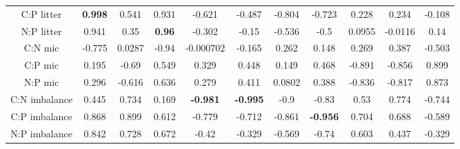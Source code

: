 \documentclass[authoryear,preprint,review,12pt]{elsarticle}
\begin{document}
\begin{table}[h!]
\begin{center}
{\begin{tabular}{ccccccccccc}
  C:P litter & \textbf{ 0.998 } & 0.541 & 0.931 & -0.621 & -0.487 & -0.804 & -0.723 & 0.228 & 0.234 & -0.108 \\ 
  N:P litter & 0.941 & 0.35 & \textbf{ 0.96 } & -0.302 & -0.15 & -0.536 & -0.5 & 0.0955 & -0.0116 & 0.14 \\ 
  C:N mic & -0.775 & 0.0287 & -0.94 & -0.000702 & -0.165 & 0.262 & 0.148 & 0.269 & 0.387 & -0.503 \\ 
  C:P mic & 0.195 & -0.69 & 0.549 & 0.329 & 0.448 & 0.149 & 0.468 & -0.891 & -0.856 & 0.899 \\ 
  N:P mic & 0.296 & -0.616 & 0.636 & 0.279 & 0.411 & 0.0802 & 0.388 & -0.836 & -0.817 & 0.873 \\ 
  C:N imbalance & 0.445 & 0.734 & 0.169 & \textbf{ -0.981 } & \textbf{ -0.995 } & -0.9 & -0.83 & 0.53 & 0.774 & -0.744 \\ 
  C:P imbalance & 0.868 & 0.899 & 0.612 & -0.779 & -0.712 & -0.861 & \textbf{ -0.956 } & 0.704 & 0.688 & -0.589 \\ 
  N:P imbalance & 0.842 & 0.728 & 0.672 & -0.42 & -0.329 & -0.569 & -0.74 & 0.603 & 0.437 & -0.329 \\ 
   \hline
\end{tabular}
}
\end{center}
\end{table}
\end{document}
